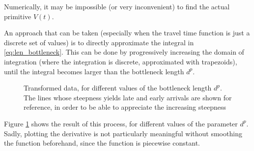 \documentclass{article}
\begin{document}
Numerically, it may be impossible (or very inconvenient) to find the actual primitive \(V(t)\).

An approach that can be taken (especially when the travel time function is just a discrete set of values) is to directly approximate the integral in \eqref{eq:len_bottleneck}.
This can be done by progressively increasing the domain of integration (where the integration is discrete, approximated with trapezoids),
until the integral becomes larger than the bottleneck length \(d^p\).

\begin{figure}
  \centering
  \caption{Transformed data, for different values of the bottleneck length $d^p$. The lines whose steepness yields late and early arrivals are shown for reference, in order to be able to appreciate the increasing steepness}
  \label{fig:modifying_data}
\end{figure}

Figure \ref{fig:modifying_data} shows the result of this process, for different values of the parameter \(d^p\).
Sadly, plotting the derivative is not particularly meaningful without smoothing the function beforehand,
since the function is piecewise constant.
\end{document}
